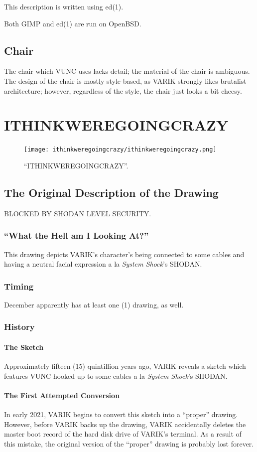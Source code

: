 \documentclass{report}
\begin{document}
This description is written using ed(1).

Both GIMP and ed(1) are run on OpenBSD\@.
\section{Chair}
The chair which VUNC uses lacks detail; the material of the chair is ambiguous.  The design of the chair is mostly style-based, as VARIK strongly likes brutalist architecture; however, regardless of the style, the chair just looks a bit cheesy.
\chapter{ITHINKWEREGOINGCRAZY}
\begin{figure}[ht]
	\centering
	\texttt{[image: ithinkweregoingcrazy/ithinkweregoingcrazy.png]}
	\caption[center]{``ITHINKWEREGOINGCRAZY''.}
\end{figure}
\section{The Original Description of the Drawing}
BLOCKED BY SHODAN LEVEL SECURITY\@.
\subsection{``What the Hell am I Looking At?''}
This drawing depicts VARIK's character's being connected to some cables and having a neutral facial expression a la \textit{System Shock}'s SHODAN\@.
\subsection{Timing}
December apparently has at least one (1) drawing, as well.
\subsection{History}
\subsubsection{The Sketch}
Approximately fifteen (15) quintillion years ago, VARIK reveals a sketch which features VUNC hooked up to some cables a la \textit{System Shock}'s SHODAN\@.
\subsubsection{The First Attempted Conversion}
In early 2021, VARIK begins to convert this sketch into a ``proper'' drawing.  However, before VARIK backs up the drawing, VARIK accidentally deletes the master boot record of the hard disk drive of VARIK's terminal.  As a result of this mistake, the original version of the ``proper'' drawing is probably lost forever.
\end{document}
